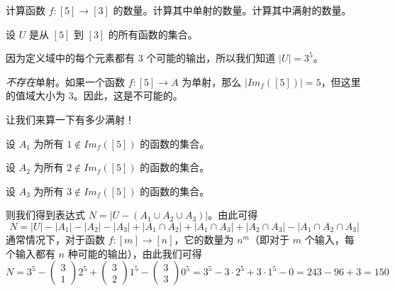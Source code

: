 \begin{example}[满射计数]

    计算函数 $f:[5] \to [3]$ 的数量。计算其中单射的数量。计算其中满射的数量。

    设 $U$ 是从 $[5]$ 到 $[3]$ 的所有函数的集合。

    因为定义域中的每个元素都有 $3$ 个可能的输出，所以我们知道 $|U| = 3^5$。

    \emph{不存在}单射。如果一个函数 $f : [5] \to A$ 为单射，那么 $|Im_f ([5])| = 5$，但这里的值域大小为 $3$。因此，这是不可能的。

    让我们来算一下有多少满射！

    设 $A_1$ 为所有 $1 \notin Im_f ([5])$ 的函数的集合。

    设 $A_2$ 为所有 $2 \notin Im_f ([5])$ 的函数的集合。

    设 $A_3$ 为所有 $3 \notin Im_f ([5])$ 的函数的集合。

    则我们得到表达式 $N = |U - (A_1 \cup A_2 \cup A_3)|$。由此可得
    \[N = |U| - |A_1| - |A_2| - |A_3| + |A_1 \cap A_2| + |A_1 \cap A_3| + |A_2 \cap A_3| - |A_1 \cap A_2 \cap A_3|\]
    通常情况下，对于函数 $f : [m] \to [n]$，它的数量为 $n^m$（即对于 $m$ 个输入，每个输入都有 $n$ 种可能的输出），由此我们可得
    \[N=3^5-\begin{pmatrix}3\\1\end{pmatrix}2^5+\begin{pmatrix}3\\2\end{pmatrix}1^5-\begin{pmatrix}3\\3\end{pmatrix}0^5=3^5-3 \cdot 2^5 + 3 \cdot 1^5 - 0 = 243 - 96 + 3 = 150\]
\end{example}

